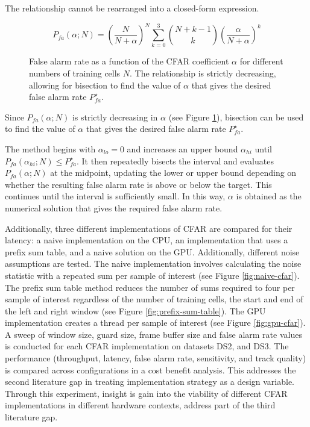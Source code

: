The relationship cannot be rearranged into a closed-form expression. 

\begin{equation}
    P_{fa}(\alpha;N) = \left( \frac{N}{N+\alpha} \right)^N
    \sum_{k=0}^{3} \binom{N+k-1}{k}
    \left( \frac{\alpha}{N+\alpha} \right)^k
\end{equation}

\begin{figure}
    \centering
    
    \caption[False alarm rate as a function of the CFAR coefficient $\alpha$.]{False alarm rate as a function 
    of the CFAR coefficient $\alpha$ for different numbers of training cells $N$. The relationship is strictly 
    decreasing, allowing for bisection to find the value of $\alpha$ that gives the desired false alarm rate 
    \(P_{fa}^{\star}\).}
    \label{fig:pfa_vs_alpha}
\end{figure}

Since $P_{fa}(\alpha;N)$ is strictly decreasing in $\alpha$ (see Figure \ref{fig:pfa_vs_alpha}), bisection can be used 
to find the value of $\alpha$ that gives the desired false alarm rate \(P_{fa}^{\star}\).

The method begins with $\alpha_{lo}=0$ and increases an upper bound $\alpha_{hi}$ until 
$P_{fa}(\alpha_{hi};N) \leq P_{fa}^{\star}$. It then repeatedly bisects the interval and evaluates 
$P_{fa}(\alpha;N)$ at the midpoint, updating the lower or upper bound depending on whether the resulting 
false alarm rate is above or below the target. This continues until the interval is sufficiently small. 
In this way, $\alpha$ is obtained as the numerical solution that gives the required false alarm rate.

Additionally, three different implementations of CFAR are compared for their latency: a naive
implementation on the CPU, an implementation that uses a prefix sum table, and a naive solution on the
GPU. Additionally, different noise assumptions are tested. The naive implementation involves calculating 
the noise statistic with a repeated sum per sample of interest (see Figure \ref{fig:naive-cfar}). 
The prefix sum table method reduces the 
number of sums required to four per sample of interest regardless of the number of training cells, the
start and end of the left and right window (see 
Figure \ref{fig:prefix-sum-table}). The GPU implementation creates a thread per sample of interest (see 
Figure \ref{fig:gpu-cfar}). A sweep of window size, guard size, frame buffer size and false alarm rate values is 
conducted for each CFAR implementation on datasets DS2, and DS3. The performance (throughput, latency, 
false alarm rate, sensitivity, and track quality) is compared across configurations in a cost benefit 
analysis. 
This addresses the second literature gap in treating implementation strategy as a design 
variable. Through this experiment, insight is gain into the viability of different CFAR implementations
in different hardware contexts, address part of the third literature gap. 

